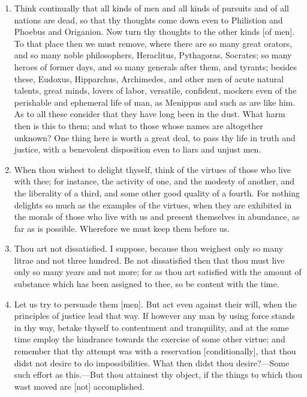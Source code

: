 \begin{enumerate}
\item Think continually that all kinds of men and all kinds of pursuits and of all nations are dead, so that thy thoughts come down even to Philistion and Phoebus and Origanion. Now turn thy thoughts to the other kinds [{\clarify of men}]. To that place then we must remove, where there are so many great orators, and so many noble philosophers, Heraclitus, Pythagoras, Socrates; so many heroes of former days, and so many generals after them, and tyrants; besides these, Eudoxus, Hipparchus, Archimedes, and other men of acute natural talents, great minds, lovers of labor, versatile, confident, mockers even of the perishable and ephemeral life of man, as Menippus and such as are like him. As to all these consider that they have long been in the dust. What harm then is this to them; and what to those whose names are altogether unknown? One thing here is worth a great deal, to pass thy life in truth and justice, with a benevolent disposition even to liars and unjust men.

\item When thou wishest to delight thyself, think of the virtues of those who live with thee; for instance, the activity of one, and the modesty of another, and the liberality of a third, and some other good quality of a fourth. For nothing delights so much as the examples of the virtues, when they are exhibited in the morals of those who live with us and present themselves in abundance, as far as is possible. Wherefore we must keep them before us.

\item Thou art not dissatisfied. I suppose, because thou weighest only so many litrae and not three hundred. Be not dissatisfied then that thou must live only so many years and not more; for as thou art satisfied with the amount of substance which has been assigned to thee, so be content with the time.

\item Let us try to persuade them [{\clarify men}]. But act even against their will, when the principles of justice lead that way. If however any man by using force stands in thy way, betake thyself to contentment and tranquility, and at the same time employ the hindrance towards the exercise of some other virtue; and remember that thy attempt was with a reservation [{\clarify conditionally}], that thou didst not desire to do impossibilities. What then didst thou desire?—Some such effort as this.—But thou attainest thy object, if the things to which thou wast moved are [{\clarify not}] accomplished.


\end{enumerate}
